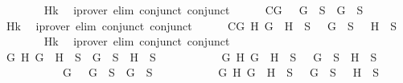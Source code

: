 \begin{isabellebody}
\ \ \ \ \ \ \isamarkupfalse%
\ Hk\ \isamarkupfalse%
\ {\isacharparenleft}iprover\ elim{\isacharcolon}\ conjunct{}\ conjunct{}{\isacharparenright}\isanewline
\ \ \ \ \isamarkupfalse%
\ C{}{}{\isacharcolon}{\isachardoublequoteopen}{\isasymforall}G{\isachardot}\ \isactrlbold {\isasymnot}\ {\isacharparenleft}\isactrlbold {\isasymnot}\ G{\isacharparenright}\ {\isasymin}\ S\ {\isasymlongrightarrow}\ G\ {\isasymin}\ S{\isachardoublequoteclose}\isanewline
\ \ \ \ \ \ \isamarkupfalse%
\ Hk\ \isamarkupfalse%
\ {\isacharparenleft}iprover\ elim{\isacharcolon}\ conjunct{}\ conjunct{}{\isacharparenright}\isanewline
\ \ \ \ \isamarkupfalse%
\ C{}{}{\isacharcolon}{\isachardoublequoteopen}{\isasymforall}G\ H{\isachardot}\ \isactrlbold {\isasymnot}{\isacharparenleft}G\ \isactrlbold {\isasymand}\ H{\isacharparenright}\ {\isasymin}\ S\ {\isasymlongrightarrow}\ \isactrlbold {\isasymnot}\ G\ {\isasymin}\ S\ {\isasymor}\ \isactrlbold {\isasymnot}\ H\ {\isasymin}\ S{\isachardoublequoteclose}\isanewline
\ \ \ \ \ \ \isamarkupfalse%
\ Hk\ \isamarkupfalse%
\ {\isacharparenleft}iprover\ elim{\isacharcolon}\ conjunct{}\ conjunct{}{\isacharparenright}\isanewline
\ \ \ \ \isamarkupfalse%
\ {\isachardoublequoteopen}{\isacharparenleft}{\isasymforall}G\ H{\isachardot}\ G\ \isactrlbold {\isasymor}\ H\ {\isasymin}\ S\ {\isasymlongrightarrow}\ G\ {\isasymin}\ S\ {\isasymor}\ H\ {\isasymin}\ S{\isacharparenright}\isanewline
\ \ \ \ \ \ \ \ \ \ {\isasymand}\ {\isacharparenleft}{\isasymforall}G\ H{\isachardot}\ G\ \isactrlbold {\isasymrightarrow}\ H\ {\isasymin}\ S\ {\isasymlongrightarrow}\ \isactrlbold {\isasymnot}\ G\ {\isasymin}\ S\ {\isasymor}\ H\ {\isasymin}\ S{\isacharparenright}\isanewline
\ \ \ \ \ \ \ \ \ \ {\isasymand}\ {\isacharparenleft}{\isasymforall}G{\isachardot}\ \isactrlbold {\isasymnot}\ {\isacharparenleft}\isactrlbold {\isasymnot}\ G{\isacharparenright}\ {\isasymin}\ S\ {\isasymlongrightarrow}\ G\ {\isasymin}\ S{\isacharparenright}\isanewline
\ \ \ \ \ \ \ \ \ \ {\isasymand}\ {\isacharparenleft}{\isasymforall}G\ H{\isachardot}\ \isactrlbold {\isasymnot}{\isacharparenleft}G\ \isactrlbold {\isasymand}\ H{\isacharparenright}\ {\isasymin}\ S\ {\isasymlongrightarrow}\ \isactrlbold {\isasymnot}\ G\ {\isasymin}\ S\ {\isasymor}\ \isactrlbold {\isasymnot}\ H\ {\isasymin}\ S{\isacharparenright}{\isachardoublequoteclose}\isanewline

\end{isabellebody}
